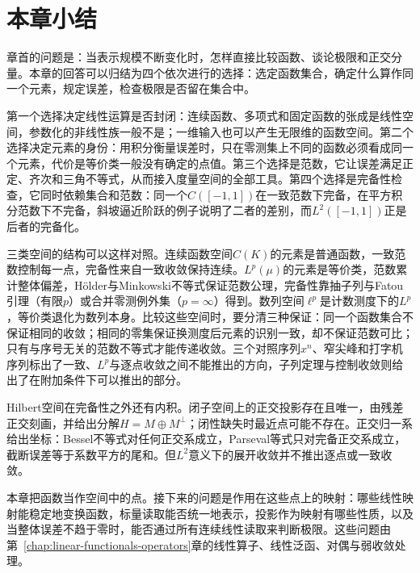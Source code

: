 
\section{本章小结}
\label{sec:fs-summary}

章首的问题是：当表示规模不断变化时，怎样直接比较函数、谈论极限和正交分量。本章的回答可以归结为四个依次进行的选择：选定函数集合，确定什么算作同一个元素，规定误差，检查极限是否留在集合中。

第一个选择决定线性运算是否封闭：连续函数、多项式和固定函数的张成是线性空间，参数化的非线性族一般不是；一维输入也可以产生无限维的函数空间。第二个选择决定元素的身份：用积分衡量误差时，只在零测集上不同的函数必须看成同一个元素，代价是等价类一般没有确定的点值。第三个选择是范数，它让误差满足正定、齐次和三角不等式，从而接入度量空间的全部工具。第四个选择是完备性检查，它同时依赖集合和范数：同一个$C([-1,1])$在一致范数下完备，在平方积分范数下不完备，斜坡逼近阶跃的例子说明了二者的差别，而$L^2([-1,1])$正是后者的完备化。

三类空间的结构可以这样对照。连续函数空间$C(K)$的元素是普通函数，一致范数控制每一点，完备性来自一致收敛保持连续。$L^p(\mu)$的元素是等价类，范数累计整体偏差，Hölder与Minkowski不等式保证范数公理，完备性靠抽子列与Fatou引理（有限$p$）或合并零测例外集（$p=\infty$）得到。数列空间$\ell^p$是计数测度下的$L^p$，等价类退化为数列本身。比较这些空间时，要分清三种保证：同一个函数集合不保证相同的收敛；相同的零集保证换测度后元素的识别一致，却不保证范数可比；只有与序号无关的范数不等式才能传递收敛。三个对照序列$x^n$、窄尖峰和打字机序列标出了一致、$L^p$与逐点收敛之间不能推出的方向，子列定理与控制收敛则给出了在附加条件下可以推出的部分。

Hilbert空间在完备性之外还有内积。闭子空间上的正交投影存在且唯一，由残差正交刻画，并给出分解$H=M\oplus M^\perp$；闭性缺失时最近点可能不存在。正交归一系给出坐标：Bessel不等式对任何正交系成立，Parseval等式只对完备正交系成立，截断误差等于系数平方的尾和。但$L^2$意义下的展开收敛并不推出逐点或一致收敛。

本章把函数当作空间中的点。接下来的问题是作用在这些点上的映射：哪些线性映射能稳定地变换函数，标量读取能否统一地表示，投影作为映射有哪些性质，以及当整体误差不趋于零时，能否通过所有连续线性读取来判断极限。这些问题由第~\ref{chap:linear-functionals-operators}章的线性算子、线性泛函、对偶与弱收敛处理。
